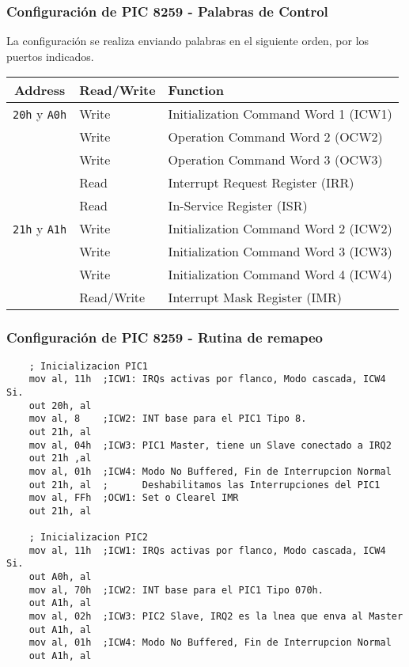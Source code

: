 \documentclass[aspectratio=169]{beamer}
\begin{document}
\begin{frame}
    \frametitle{Configuración de PIC 8259 - Palabras de Control}
    La configuración se realiza enviando palabras en el siguiente orden, por los puertos indicados.
    \begin{table}
    \centering
    \begin{tabular}{|c|l|l|}
        \hline
        Address & \textcolor{verdeuca}{Read/Write} & Function \\
        \hline \hline
        \texttt{20h} y \texttt{A0h} & \textcolor{verdeuca}{Write}      & Initialization Command Word 1 (ICW1) \\
                                    & \textcolor{verdeuca}{Write}      & Operation Command Word 2 (OCW2) \\
                                    & \textcolor{verdeuca}{Write}      & Operation Command Word 3 (OCW3) \\
                                    & \textcolor{verdeuca}{Read}       & Interrupt Request Register (IRR) \\
                                    & \textcolor{verdeuca}{Read}       & In-Service Register (ISR) \\
        \hline
        \texttt{21h} y \texttt{A1h} & \textcolor{verdeuca}{Write}      & Initialization Command Word 2 (ICW2) \\
                                    & \textcolor{verdeuca}{Write}      & Initialization Command Word 3 (ICW3) \\
                                    & \textcolor{verdeuca}{Write}      & Initialization Command Word 4 (ICW4) \\
                                    & \textcolor{verdeuca}{Read/Write} & Interrupt Mask Register (IMR) \\
        \hline
    \end{tabular}
    \end{table}
\end{frame}

\begin{frame}[fragile]
    \frametitle{Configuración de PIC 8259 - Rutina de remapeo}
    \scriptsize
    \begin{verbatim}
    ; Inicializacion PIC1
    mov al, 11h  ;ICW1: IRQs activas por flanco, Modo cascada, ICW4 Si.
    out 20h, al
    mov al, 8    ;ICW2: INT base para el PIC1 Tipo 8.
    out 21h, al
    mov al, 04h  ;ICW3: PIC1 Master, tiene un Slave conectado a IRQ2
    out 21h ,al
    mov al, 01h  ;ICW4: Modo No Buffered, Fin de Interrupcion Normal
    out 21h, al  ;      Deshabilitamos las Interrupciones del PIC1
    mov al, FFh  ;OCW1: Set o Clearel IMR
    out 21h, al

    ; Inicializacion PIC2
    mov al, 11h  ;ICW1: IRQs activas por flanco, Modo cascada, ICW4 Si.
    out A0h, al
    mov al, 70h  ;ICW2: INT base para el PIC1 Tipo 070h.
    out A1h, al
    mov al, 02h  ;ICW3: PIC2 Slave, IRQ2 es la lnea que enva al Master
    out A1h, al
    mov al, 01h  ;ICW4: Modo No Buffered, Fin de Interrupcion Normal
    out A1h, al
    \end{verbatim}
\end{frame}
\end{document}
